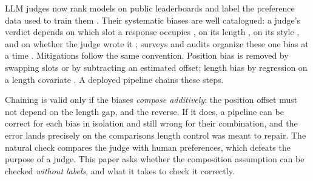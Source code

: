 \documentclass[10pt]{article}
\theoremstyle{remark}
\begin{document}
LLM judges now rank models on public leaderboards and label the
preference data used to train them
\citep{zheng2023judging,dubois2023alpacafarm,chiang2024arena,lee2023rlaif}.
Their systematic biases are well catalogued: a judge's verdict depends on
which slot a response occupies \citep{wang2023fair,shi2024position}, on
its length \citep{saito2023verbosity,dubois2024length,singhal2023long},
on its style \citep{wu2023style}, and on whether the judge wrote it
\citep{panickssery2024llm,wataoka2024selfpref}; surveys and audits
organize these one bias at a time
\citep{ye2024justice,gu2024survey,li2024generation,thakur2024judging,koo2023benchmarking}.
Mitigations follow the same convention. Position bias is removed by
swapping slots or by subtracting an estimated offset; length bias by
regression on a length covariate \citep{dubois2024length}. A deployed
pipeline chains these steps.

Chaining is valid only if the biases \emph{compose additively}: the
position offset must not depend on the length gap, and the reverse. If
it does, a pipeline can be correct for each bias in isolation and still
wrong for their combination, and the error lands precisely on the
comparisons length control was meant to repair. The natural check
compares the judge with human preferences, which defeats the purpose of
a judge. This paper asks whether the composition assumption can be
checked \emph{without labels}, and what it takes to check it correctly.
\end{document}
